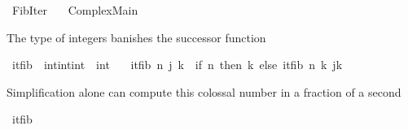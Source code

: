 %
\begin{isabellebody}%
%
%
\isadelimdocument
%
\endisadelimdocument
%
\isatagdocument
%
\isamarkuptrue%
%
\endisatagdocument
{\isafolddocument}%
%
\isadelimdocument
%
\endisadelimdocument
%
\isadelimtheory
%
\endisadelimtheory
%
\isatagtheory
{}\isamarkupfalse%
\ Fib{\isacharunderscore}{\kern0pt}Iter\isanewline
\ \ \ Complex{\isacharunderscore}{\kern0pt}Main\ \ %
\isanewline
{}%
\endisatagtheory
{\isafoldtheory}%
%
\isadelimtheory
%
\endisadelimtheory
%
\begin{isamarkuptext}%
The type of integers banishes the successor function%
\end{isamarkuptext}\isamarkuptrue%
\isamarkupfalse%
\ itfib\ {\isacharcolon}{\kern0pt}{\isacharcolon}{\kern0pt}\ {\isachardoublequoteopen}{\isacharbrackleft}{\kern0pt}int{\isacharcomma}{\kern0pt}int{\isacharcomma}{\kern0pt}int{\isacharbrackright}{\kern0pt}\ {\isasymRightarrow}\ int{\isachardoublequoteclose}\ \isanewline
\ \ {\isachardoublequoteopen}itfib\ n\ j\ k\ {\isacharequal}{\kern0pt}\ {\isacharparenleft}{\kern0pt}if\ n{\isasymle}{}\ then\ k\ else\ itfib\ {\isacharparenleft}{\kern0pt}n{\isacharminus}{\kern0pt}{}{\isacharparenright}{\kern0pt}\ k\ {\isacharparenleft}{\kern0pt}j{\isacharplus}{\kern0pt}k{\isacharparenright}{\kern0pt}{\isacharparenright}{\kern0pt}{\isachardoublequoteclose}%
\begin{isamarkuptext}%
Simplification alone can compute this colossal number
   in a fraction of a second%
\end{isamarkuptext}\isamarkuptrue%
\isamarkupfalse%
\ {\isachardoublequoteopen}itfib\ {}{}{}\ {}\ {}\ {\isacharequal}{\kern0pt}\ {}{}{}{}{}{}{}{}{}{}{}{}{}{}{}{}{}{}{}{}{}{}{}{}{}{}{}{}{}{}{}{}{}{}{}{}{}{}{}{}{}{}{\isachardoublequoteclose}\isanewline

\end{isabellebody}
